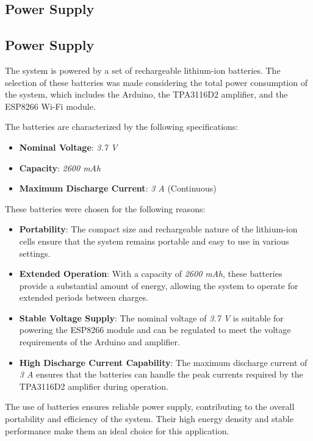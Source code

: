 \subsection{Power Supply}
\subsection{Power Supply}

The system is powered by a set of rechargeable lithium-ion batteries. The selection of these batteries was made considering the total power consumption of the system, which includes the Arduino, the TPA3116D2 amplifier, and the ESP8266 Wi-Fi module.

The batteries are characterized by the following specifications:

\begin{itemize}
    \item \textbf{Nominal Voltage}: \textit{3.7 V}
    \item \textbf{Capacity}: \textit{2600 mAh}
    \item \textbf{Maximum Discharge Current}: \textit{3 A} (Continuous)
\end{itemize}

These batteries were chosen for the following reasons:
\begin{itemize}
    \item \textbf{Portability}: The compact size and rechargeable nature of the lithium-ion cells ensure that the system remains portable and easy to use in various settings.
    \item \textbf{Extended Operation}: With a capacity of \textit{2600 mAh}, these batteries provide a substantial amount of energy, allowing the system to operate for extended periods between charges.
    \item \textbf{Stable Voltage Supply}: The nominal voltage of \textit{3.7 V} is suitable for powering the ESP8266 module and can be regulated to meet the voltage requirements of the Arduino and amplifier.
    \item \textbf{High Discharge Current Capability}: The maximum discharge current of \textit{3 A} ensures that the batteries can handle the peak currents required by the TPA3116D2 amplifier during operation.
\end{itemize}

The use of batteries ensures reliable power supply, contributing to the overall portability and efficiency of the system. Their high energy density and stable performance make them an ideal choice for this application.

